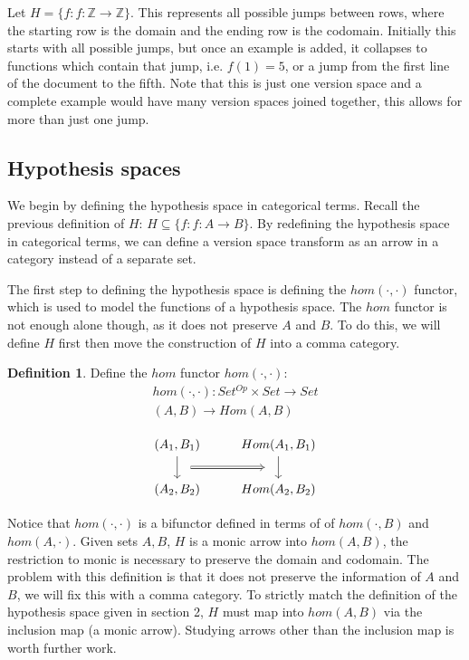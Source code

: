 \documentclass{article}
\theoremstyle{definition}
\newtheorem{definition}{Definition}[section]
\begin{document}
Let $H = \{f: f: \mathbb{Z} \rightarrow \mathbb{Z}\}$. This represents all possible jumps between rows, where the starting row is the domain and the ending row is the codomain. Initially this starts with all possible jumps, but once an example is added, it collapses to functions which contain that jump, i.e. $f(1) = 5$, or a jump from the first line of the document to the fifth. Note that this is just one version space and a complete example would have many version spaces joined together, this allows for more than just one jump. 


\subsection{Hypothesis spaces}
We begin by defining the hypothesis space in categorical terms. Recall the previous definition of $H$: $H\subseteq \{f: f: A \rightarrow B\}$.
By redefining the hypothesis space in categorical terms, we can define a version space transform as an arrow in a category instead of a separate set. 

The first step to defining the hypothesis space is defining the $hom(\cdot, \cdot)$ functor, which is used to model the functions of a hypothesis space. The $hom$ functor is not enough alone though, as it does not preserve $A$ and $B$. To do this, we will define $H$ first then move the construction of $H$ into a comma category.
\begin{definition}
Define the $hom$ functor $hom(\cdot,\cdot)$:
\begin{gather*}
    hom(\cdot,\cdot):Set^{Op} \times Set \rightarrow Set \\
    (A,B) \rightarrow Hom(A,B) \\
\end{gather*}
\[\begin{tikzcd}
	{(A_1, B_1)} & {Hom(A_1, B_1)} \\
	{(A_2,B_2)} & {Hom(A_2,B_2)}
	\arrow[""{name=0, anchor=center, inner sep=0}, from=1-2, to=2-2]
	\arrow[""{name=1, anchor=center, inner sep=0}, from=1-1, to=2-1]
	\arrow[shorten <=10pt, shorten >=10pt, Rightarrow, from=1, to=0]
\end{tikzcd}\]
\end{definition}
Notice that $hom(\cdot, \cdot)$ is a bifunctor defined in terms of of $hom(\cdot,B)$ and $hom(A,\cdot)$. Given sets $A, B$, $H$ is a monic arrow into $hom(A,B)$, the restriction to monic is necessary to preserve the domain and codomain. The problem with this definition is that it does not preserve the information of $A$ and $B$, we will fix this with a comma category. To strictly match the definition of the hypothesis space given in section 2, $H$ must map into $hom(A,B)$ via the inclusion map (a monic arrow). Studying arrows other than the inclusion map is worth further work. 
\end{document}
